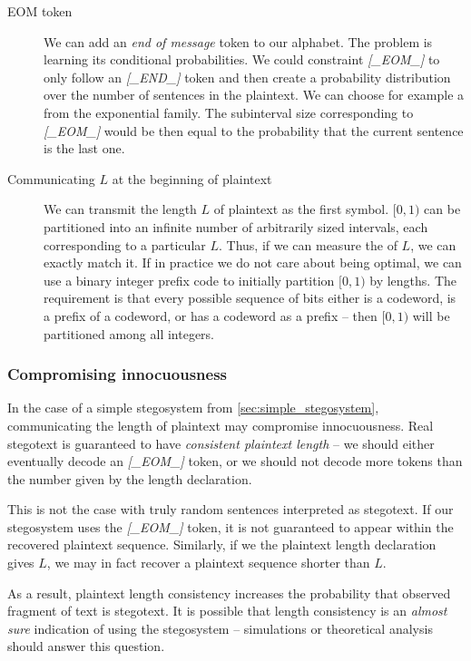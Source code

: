 \documentclass[draft]{IIBproject}
\makeatletter
\DeclareRobustCommand*{\AbbreviationWithDot}[1]{\@ifnextchar{.}{#1}{#1.\@\xspace}}
\DeclareRobustCommand*{\pmf}{\AbbreviationWithDot{p.m.f}}
\DeclareRobustCommand{\ngram}[1]{\emph{[#1]}}
\makeatother
\begin{document}
\begin{description}
	\item[EOM token] We can add an \emph{end of message} token to our alphabet. The problem is learning its conditional probabilities. We could constraint \ngram{\_EOM\_} to only follow an \ngram{\_END\_} token and then create a probability distribution over the number of sentences in the plaintext. We can choose for example a \pmf from the exponential family. The subinterval size corresponding to \ngram{\_EOM\_} would be then equal to the probability that the current sentence is the last one.
	\item[Communicating $L$ at the beginning of plaintext] We can transmit the length $L$ of plaintext as the first symbol. $[0,1)$ can be partitioned into an infinite number of arbitrarily sized intervals, each corresponding to a particular $L$. Thus, if we can measure the \pmf of $L$, we can exactly match it. If in practice we do not care about being optimal, we can use a binary integer prefix code to initially partition $[0,1)$ by lengths. The requirement is that every possible sequence of bits either is a codeword, is a prefix of a codeword, or has a codeword as a prefix -- then $[0,1)$ will be partitioned among all integers.
\end{description}

\subsubsection{Compromising innocuousness}

In the case of a simple stegosystem from \cref{sec:simple_stegosystem}, communicating the length of plaintext may compromise innocuousness. Real stegotext is guaranteed to have \emph{consistent plaintext length} -- we should either eventually decode an \ngram{\_EOM\_} token, or we should not decode more tokens than the number given by the length declaration.

This is not the case with truly random sentences interpreted as stegotext. If our stegosystem uses the \ngram{\_EOM\_} token, it is not guaranteed to appear within the recovered plaintext sequence. Similarly, if we the plaintext length declaration gives $L$, we may in fact recover a plaintext sequence shorter than $L$.

As a result, plaintext length consistency increases the probability that observed fragment of text is stegotext. It is possible that length consistency is an \emph{almost sure} indication of using the stegosystem -- simulations or theoretical analysis should answer this question.
\end{document}
